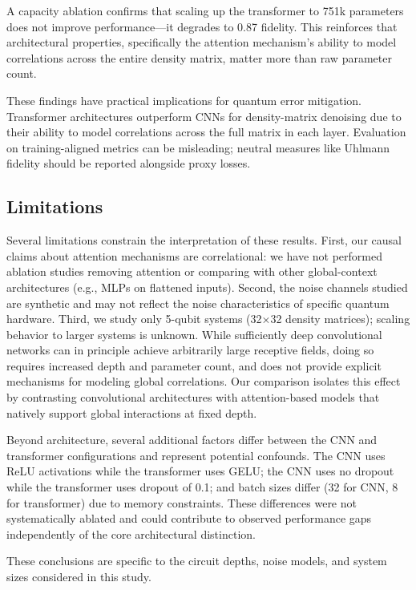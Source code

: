 \documentclass[a4paper, 11pt, colorlinks=true, citecolor=., linkcolor=black, urlcolor=black]{article}
\begin{document}
A capacity ablation confirms that scaling up the transformer to 751k parameters does not improve performance—it degrades to 0.87 fidelity. This reinforces that architectural properties, specifically the attention mechanism's ability to model correlations across the entire density matrix, matter more than raw parameter count.

These findings have practical implications for quantum error mitigation. Transformer architectures outperform CNNs for density-matrix denoising due to their ability to model correlations across the full matrix in each layer. Evaluation on training-aligned metrics can be misleading; neutral measures like Uhlmann fidelity should be reported alongside proxy losses.
\subsection{Limitations}
\label{sec:org046c7ae}

Several limitations constrain the interpretation of these results. First, our causal claims about attention mechanisms are correlational: we have not performed ablation studies removing attention or comparing with other global-context architectures (e.g., MLPs on flattened inputs). Second, the noise channels studied are synthetic and may not reflect the noise characteristics of specific quantum hardware. Third, we study only 5-qubit systems (32×32 density matrices); scaling behavior to larger systems is unknown. While sufficiently deep convolutional networks can in principle achieve arbitrarily large receptive fields, doing so requires increased depth and parameter count, and does not provide explicit mechanisms for modeling global correlations. Our comparison isolates this effect by contrasting convolutional architectures with attention-based models that natively support global interactions at fixed depth.

Beyond architecture, several additional factors differ between the CNN and transformer configurations and represent potential confounds. The CNN uses ReLU activations while the transformer uses GELU; the CNN uses no dropout while the transformer uses dropout of 0.1; and batch sizes differ (32 for CNN, 8 for transformer) due to memory constraints. These differences were not systematically ablated and could contribute to observed performance gaps independently of the core architectural distinction.

These conclusions are specific to the circuit depths, noise models, and system sizes considered in this study.
\end{document}
